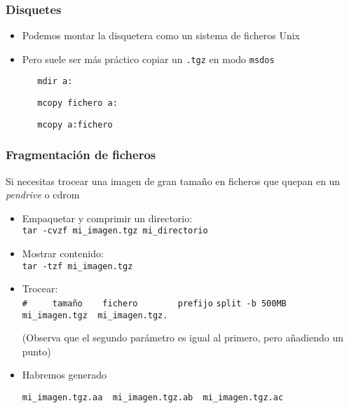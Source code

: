 \documentclass[ucs]{beamer}
\begin{document}
\begin{frame}[fragile]
\frametitle{Disquetes }

\begin{itemize}
\item
Podemos montar la disquetera como un sistema de ficheros Unix

\item
Pero suele ser más práctico copiar un \verb|.tgz| en modo \verb|msdos|

\verb|   mdir a:  |

\verb|   mcopy fichero a:  |

\verb|   mcopy a:fichero   |

\end{itemize}

\end{frame}


\begin{frame}[fragile]

\frametitle{Fragmentación de ficheros }
Si necesitas trocear una imagen de gran tamaño en ficheros que quepan en un 
\emph{pendrive} o cdrom

\begin{itemize}
\item
Empaquetar y comprimir un directorio:\\ \verb|tar -cvzf mi_imagen.tgz mi_directorio|
\item
Mostrar contenido:\\ \verb|tar -tzf mi_imagen.tgz|

\item
Trocear:\\
\verb|#     tamaño    fichero        prefijo|
\verb|split -b 500MB  mi_imagen.tgz  mi_imagen.tgz.|
\begin{footnotesize}
(Observa que el segundo parámetro es igual al primero, pero
añadiendo un punto)
\end{footnotesize}


\item
Habremos generado
  \begin{footnotesize}
  \begin{verbatim}
mi_imagen.tgz.aa  mi_imagen.tgz.ab  mi_imagen.tgz.ac
  \end{verbatim}
  \end{footnotesize}
\end{itemize}
\end{frame}
\end{document}
